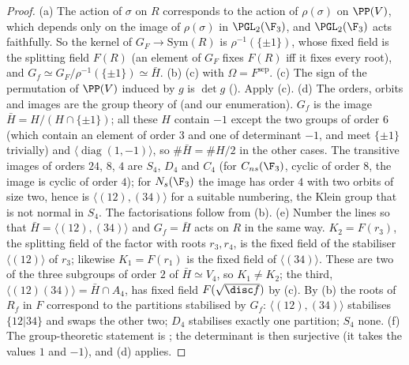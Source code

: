\begin{proof}
(a) The action of $\sigma$ on $R$ corresponds to the action of $\rho(\sigma)$ on $\PP(V)$, which depends only on the image of $\rho(\sigma)$ in $\PGL_2(\F_3)$, and
$\PGL_2(\F_3)$ acts faithfully. So the kernel of $G_F\to\mathrm{Sym}(R)$ is $\rho^{-1}(\{\pm1\})$, whose fixed field is the splitting field $F(R)$ (an element of $G_F$
fixes $F(R)$ iff it fixes every root), and $G_f\simeq G_F/\rho^{-1}(\{\pm1\})\simeq\bar H$.
(b) (c) with $\Omega=F^{\mathrm{sep}}$.
(c) The sign of the permutation of $\PP(V)$ induced by $g$ is $\det g$ (). Apply (c).
(d) The orders, orbits and images are the group theory of  (and our enumeration). $G_f$ is the image $\bar H=H/(H\cap\{\pm1\})$; all these $H$ contain
$-1$ except the two groups of order $6$ (which contain an element of order $3$ and one of determinant $-1$, and meet $\{\pm1\}$ trivially) and $\langle\operatorname{diag}
(1,-1)\rangle$, so $\#\bar H=\#H/2$ in the other cases. The transitive images of orders $24$, $8$, $4$ are $S_4$, $D_4$ and $C_4$ (for $C_{ns}(\F_3)$, cyclic of order $8$, the
image is cyclic of order $4$); for $N_s(\F_3)$ the image has order $4$ with two orbits of size two, hence is $\langle(12),(34)\rangle$ for a suitable numbering, the Klein
group that is not normal in $S_4$. The factorisations follow from (b).
(e) Number the lines so that $\bar H=\langle(12),(34)\rangle$ and $G_f=\bar H$ acts on $R$ in the same way. $K_2=F(r_3)$, the splitting field of the factor with roots
$r_3,r_4$, is the fixed field of the stabiliser $\langle(12)\rangle$ of $r_3$; likewise $K_1=F(r_1)$ is the fixed field of $\langle(34)\rangle$. These are two of the three
subgroups of order $2$ of $\bar H\simeq V_4$, so $K_1\ne K_2$; the third, $\langle(12)(34)\rangle=\bar H\cap A_4$, has fixed field $F(\sqrt{\disc f})$ by
(c). By (b) the roots of $R_f$ in $F$ correspond to the partitions stabilised by $G_f$: $\langle(12),(34)\rangle$
stabilises $\{12|34\}$ and swaps the other two; $D_4$ stabilises exactly one partition; $S_4$ none.
(f) The group-theoretic statement is ; the determinant is then surjective (it takes the values $1$ and $-1$), and (d) applies.
\end{proof}

